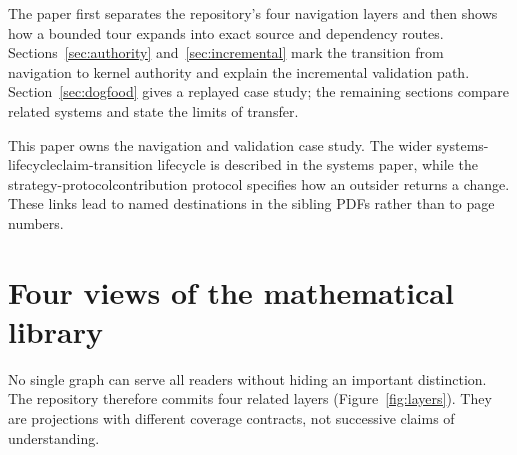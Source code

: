 \documentclass[11pt]{article}
\begin{document}
The paper first separates the repository's four navigation layers and then
shows how a bounded tour expands into exact source and dependency routes.
Sections~\ref{sec:authority} and~\ref{sec:incremental} mark the transition from
navigation to kernel authority and explain the incremental validation path.
Section~\ref{sec:dogfood} gives a replayed case study; the remaining sections
compare related systems and state the limits of transfer.

This paper owns the navigation and validation case study. The wider
%
{systems-lifecycle}{claim-transition lifecycle} is described in the systems
paper, while the
%
{strategy-protocol}{contribution protocol} specifies how an outsider returns a
change. These links lead to named destinations in the sibling PDFs rather than
to page numbers.

\section{Four views of the mathematical library}\label{sec:layers}

No single graph can serve all readers without hiding an important distinction.
The repository therefore commits four related layers (Figure~\ref{fig:layers}).
They are projections with different coverage contracts, not successive claims
of understanding.
\end{document}
